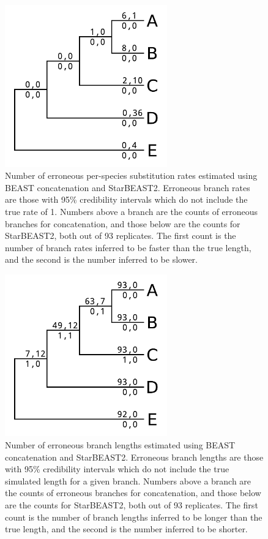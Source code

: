 \documentclass[12pt]{article}
\begin{document}
\clearpage

\begin{figure}[htb!]
\centering
\includegraphics[width=7cm]{false_branch_rates.pdf}
\caption
{Number of erroneous per-species substitution rates estimated using BEAST concatenation and StarBEAST2. Erroneous
branch rates are those with 95\% credibility intervals which do not include the true rate of 1.
Numbers above a branch are the counts of erroneous branches for concatenation, and those
below are the counts for StarBEAST2, both out of 93 replicates. The first count is
the number of branch rates inferred to be faster than the true length, and the
second is the number inferred to be slower.}
\label{fig:spilsBranchRates}
\end{figure}

\begin{figure}[htb!]
\centering
\includegraphics[width=7cm]{false_branch_lengths.pdf}
\caption
{Number of erroneous branch lengths estimated using BEAST concatenation and StarBEAST2. Erroneous
branch lengths are those with 95\% credibility intervals which do not include the true simulated length for a given branch.
Numbers above a branch are the counts of erroneous branches for concatenation, and those
below are the counts for StarBEAST2, both out of 93 replicates. The first count is
the number of branch lengths inferred to be longer than the true length, and the
second is the number inferred to be shorter.}
\label{fig:spilsBranchLengths}
\end{figure}
\end{document}
